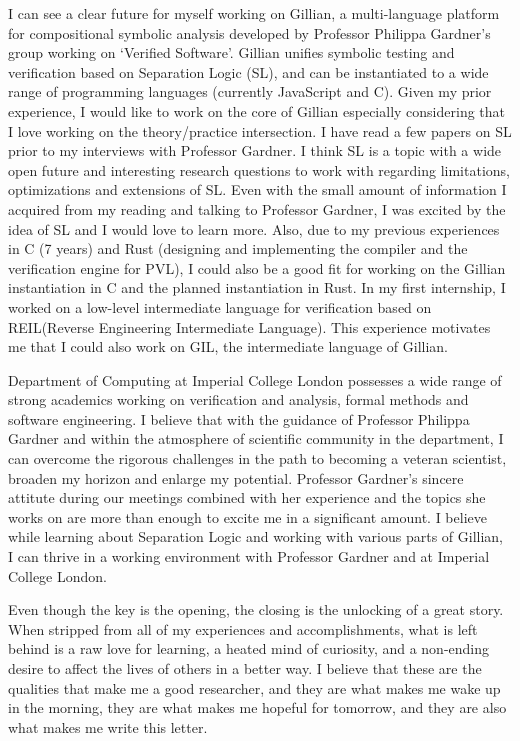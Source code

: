 \documentclass{letter}
\begin{document}
\begin{letter}{}
I can see a clear future for myself working on Gillian, a multi-language platform for compositional symbolic analysis developed by  Professor Philippa Gardner’s group working on `Verified Software’. Gillian unifies symbolic testing and verification based on Separation Logic (SL),  and can be instantiated to a wide range of programming languages (currently JavaScript and C).  Given my prior experience, I would like to work on the core of  Gillian especially considering  that I love working on the theory/practice intersection.  I have read a few papers on SL prior to my interviews with Professor Gardner. I think SL  is a topic with a wide open future and interesting research questions to work with regarding limitations, optimizations and extensions of SL. Even with the small amount of information I acquired from my reading and talking to Professor Gardner, I was excited by the idea of SL and I would love to learn more. Also, due to my previous experiences in C (7 years) and Rust (designing and implementing the compiler and the verification engine for PVL), I could also be a good fit for working on  the Gillian instantiation in C and  the planned instantiation in Rust. In my first internship, I  worked on a low-level intermediate language for verification based on REIL(Reverse Engineering Intermediate Language). This experience motivates me that I could also work on GIL, the intermediate language of Gillian. 


Department of Computing at Imperial College London possesses a wide range of strong academics working on verification and analysis, formal methods and software engineering. I believe that with the guidance of Professor Philippa Gardner and within the atmosphere of scientific community in the department, I can overcome the rigorous challenges in the path to becoming a veteran scientist, broaden my horizon and enlarge my potential. Professor Gardner's sincere attitute during our meetings combined with her experience and the topics she works on are more than enough to excite me in a significant amount. I believe while learning about Separation Logic and working with various parts of Gillian, I can thrive in a working environment with Professor Gardner and at Imperial College London.  

Even though the key is the opening, the closing is the unlocking of a great story. When stripped from all of my experiences and accomplishments, what is left behind is a raw love for learning, a heated mind of curiosity, and a non-ending desire to affect the lives of others in a better way. I believe that these are the qualities that make me a good researcher, and they are what makes me wake up in the morning, they are what makes me hopeful for tomorrow, and they are also what makes me write this letter. 

\end{letter}
\end{document}
